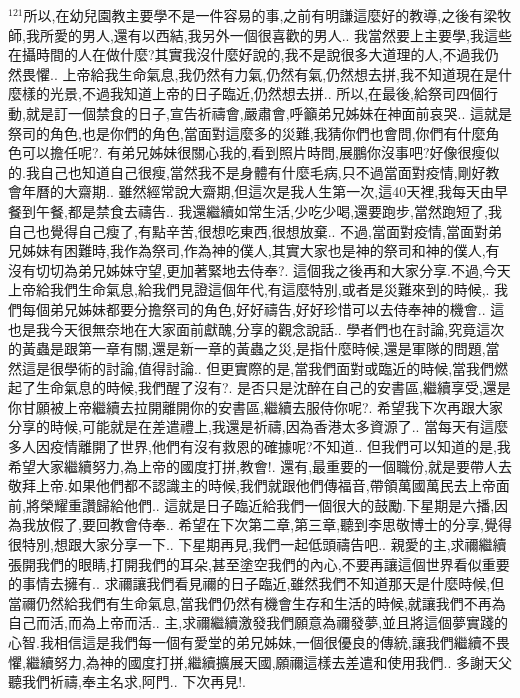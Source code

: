\documentclass{book}
\begin{document}
$^{121}$所以,在幼兒園教主要學不是一件容易的事,之前有明謙這麼好的教導,之後有梁牧師,我所愛的男人,還有以西結,我另外一個很喜歡的男人..
我當然要上主要學,我這些在攝時間的人在做什麼?其實我沒什麼好說的,我不是說很多大道理的人,不過我仍然畏懼..
上帝給我生命氣息,我仍然有力氣,仍然有氣,仍然想去拼,我不知道現在是什麼樣的光景,不過我知道上帝的日子臨近,仍然想去拼..
所以,在最後,給祭司四個行動,就是訂一個禁食的日子,宣告祈禱會,嚴肅會,呼籲弟兄姊妹在神面前哀哭..
這就是祭司的角色,也是你們的角色,當面對這麼多的災難,我猜你們也會問,你們有什麼角色可以擔任呢?.
有弟兄姊妹很關心我的,看到照片時問,展鵬你沒事吧?好像很瘦似的.我自己也知道自己很瘦,當然我不是身體有什麼毛病,只不過當面對疫情,剛好教會年曆的大齋期..
雖然經常說大齋期,但這次是我人生第一次,這40天裡,我每天由早餐到午餐,都是禁食去禱告..
我還繼續如常生活,少吃少喝,還要跑步,當然跑短了,我自己也覺得自己瘦了,有點辛苦,很想吃東西,很想放棄..
不過,當面對疫情,當面對弟兄姊妹有困難時,我作為祭司,作為神的僕人,其實大家也是神的祭司和神的僕人,有沒有切切為弟兄姊妹守望,更加著緊地去侍奉?.
這個我之後再和大家分享.不過,今天上帝給我們生命氣息,給我們見證這個年代,有這麼特別,或者是災難來到的時候,.
我們每個弟兄姊妹都要分擔祭司的角色,好好禱告,好好珍惜可以去侍奉神的機會..
這也是我今天很無奈地在大家面前獻醜,分享的觀念說話..
學者們也在討論,究竟這次的黃蟲是跟第一章有關,還是新一章的黃蟲之災,是指什麼時候,還是軍隊的問題,當然這是很學術的討論,值得討論..
但更實際的是,當我們面對或臨近的時候,當我們燃起了生命氣息的時候,我們醒了沒有?.
是否只是沈醉在自己的安書區,繼續享受,還是你甘願被上帝繼續去拉開離開你的安書區,繼續去服侍你呢?.
希望我下次再跟大家分享的時候,可能就是在差遣禮上,我還是祈禱,因為香港太多資源了..
當每天有這麼多人因疫情離開了世界,他們有沒有救恩的確據呢?不知道..
但我們可以知道的是,我希望大家繼續努力,為上帝的國度打拼,教會!.
還有,最重要的一個職份,就是要帶人去敬拜上帝.如果他們都不認識主的時候,我們就跟他們傳福音,帶領萬國萬民去上帝面前,將榮耀重讚歸給他們..
這就是日子臨近給我們一個很大的鼓勵.下星期是六播,因為我放假了,要回教會侍奉..
希望在下次第二章,第三章,聽到李思敬博士的分享,覺得很特別,想跟大家分享一下..
下星期再見,我們一起低頭禱告吧..
親愛的主,求禰繼續張開我們的眼睛,打開我們的耳朵,甚至塗空我們的內心,不要再讓這個世界看似重要的事情去擁有..
求禰讓我們看見禰的日子臨近,雖然我們不知道那天是什麼時候,但當禰仍然給我們有生命氣息,當我們仍然有機會生存和生活的時候,就讓我們不再為自己而活,而為上帝而活..
主,求禰繼續激發我們願意為禰發夢,並且將這個夢實踐的心智.我相信這是我們每一個有愛堂的弟兄姊妹,一個很優良的傳統,讓我們繼續不畏懼,繼續努力,為神的國度打拼,繼續擴展天國,願禰這樣去差遣和使用我們..
多謝天父聽我們祈禱,奉主名求,阿門..
下次再見!.
\newpage
\end{document}
